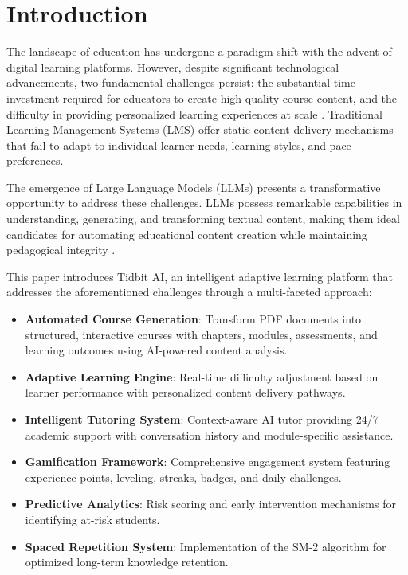 \documentclass[conference]{IEEEtran}
\begin{document}
\section{Introduction}

The landscape of education has undergone a paradigm shift with the advent of digital learning platforms. However, despite significant technological advancements, two fundamental challenges persist: the substantial time investment required for educators to create high-quality course content, and the difficulty in providing personalized learning experiences at scale \cite{zawacki2019systematic}. Traditional Learning Management Systems (LMS) offer static content delivery mechanisms that fail to adapt to individual learner needs, learning styles, and pace preferences.

The emergence of Large Language Models (LLMs) presents a transformative opportunity to address these challenges. LLMs possess remarkable capabilities in understanding, generating, and transforming textual content, making them ideal candidates for automating educational content creation while maintaining pedagogical integrity \cite{kasneci2023chatgpt}.

This paper introduces Tidbit AI, an intelligent adaptive learning platform that addresses the aforementioned challenges through a multi-faceted approach:

\begin{itemize}
    \item \textbf{Automated Course Generation}: Transform PDF documents into structured, interactive courses with chapters, modules, assessments, and learning outcomes using AI-powered content analysis.
    \item \textbf{Adaptive Learning Engine}: Real-time difficulty adjustment based on learner performance with personalized content delivery pathways.
    \item \textbf{Intelligent Tutoring System}: Context-aware AI tutor providing 24/7 academic support with conversation history and module-specific assistance.
    \item \textbf{Gamification Framework}: Comprehensive engagement system featuring experience points, leveling, streaks, badges, and daily challenges.
    \item \textbf{Predictive Analytics}: Risk scoring and early intervention mechanisms for identifying at-risk students.
    \item \textbf{Spaced Repetition System}: Implementation of the SM-2 algorithm for optimized long-term knowledge retention.
\end{itemize}
\end{document}
